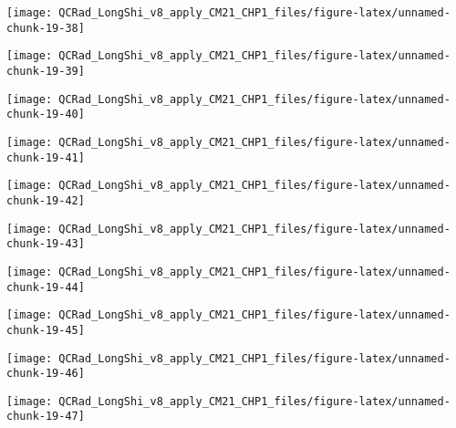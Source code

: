 \documentclass[
  10pt,
  a4paper,oneside]{article}
\begin{document}
\begin{center}\texttt{[image: QCRad\_LongShi\_v8\_apply\_CM21\_CHP1\_files/figure-latex/unnamed-chunk-19-38]} \end{center}

\begin{center}\texttt{[image: QCRad\_LongShi\_v8\_apply\_CM21\_CHP1\_files/figure-latex/unnamed-chunk-19-39]} \end{center}

\begin{center}\texttt{[image: QCRad\_LongShi\_v8\_apply\_CM21\_CHP1\_files/figure-latex/unnamed-chunk-19-40]} \end{center}

\begin{center}\texttt{[image: QCRad\_LongShi\_v8\_apply\_CM21\_CHP1\_files/figure-latex/unnamed-chunk-19-41]} \end{center}

\begin{center}\texttt{[image: QCRad\_LongShi\_v8\_apply\_CM21\_CHP1\_files/figure-latex/unnamed-chunk-19-42]} \end{center}

\begin{center}\texttt{[image: QCRad\_LongShi\_v8\_apply\_CM21\_CHP1\_files/figure-latex/unnamed-chunk-19-43]} \end{center}

\begin{center}\texttt{[image: QCRad\_LongShi\_v8\_apply\_CM21\_CHP1\_files/figure-latex/unnamed-chunk-19-44]} \end{center}

\begin{center}\texttt{[image: QCRad\_LongShi\_v8\_apply\_CM21\_CHP1\_files/figure-latex/unnamed-chunk-19-45]} \end{center}

\begin{center}\texttt{[image: QCRad\_LongShi\_v8\_apply\_CM21\_CHP1\_files/figure-latex/unnamed-chunk-19-46]} \end{center}

\begin{center}\texttt{[image: QCRad\_LongShi\_v8\_apply\_CM21\_CHP1\_files/figure-latex/unnamed-chunk-19-47]} \end{center}
\end{document}
